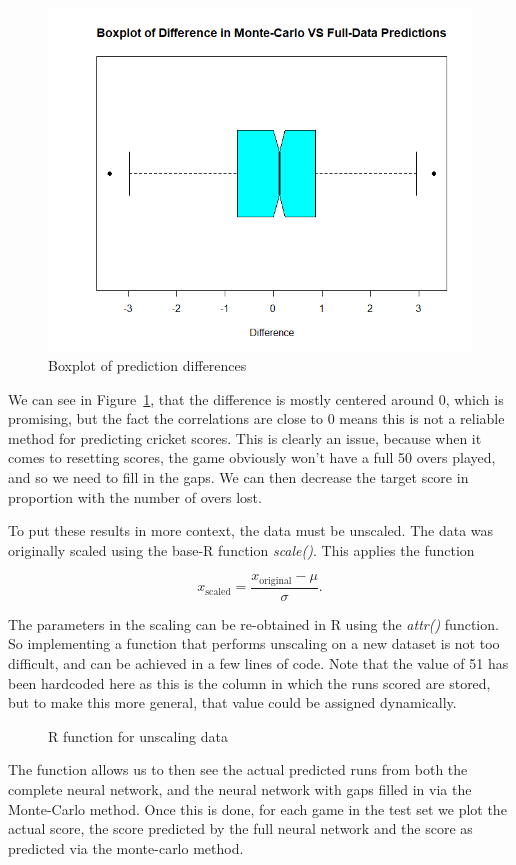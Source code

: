\begin{figure}[h]
    \centering
    \includegraphics[width=0.4\linewidth]{figures/diffbox.png}
    \caption{Boxplot of prediction differences}
    \label{diffbox}
\end{figure}

We can see in Figure~\ref{diffbox}, that the difference is mostly centered around 0, which is promising, but the fact the correlations are close to 0 means this is not a reliable method for predicting 
cricket scores. This is clearly an issue, because when it comes to resetting scores, the game obviously won't have a full 50 overs played, and so we need to fill in the gaps. We can then decrease the target score in proportion 
with the number of overs lost.

To put these results in more context, the data must be unscaled. The data was originally scaled using the base-R function \textit{scale()}. This applies the function

\[
    x_{\text{scaled}} = \frac{x_{\text{original}}-\mu}{\sigma}.    
\]

The parameters in the scaling can be re-obtained in R using the \textit{attr()} function. So implementing a function that 
performs unscaling on a new dataset is not too difficult, and can be achieved in a few lines of code. Note that the value of 51 has been hardcoded 
here as this is the column in which the runs scored are stored, but to make this more general, that value could be assigned dynamically.

\begin{figure}[h]
    
    \caption{R function for unscaling data}
    \label{unscale}
\end{figure}

The function allows us to then see the actual predicted runs from both the complete neural network, and the neural network with 
gaps filled in via the Monte-Carlo method. Once this is done, for each game in the test set we plot the actual score, the score predicted by the full neural network and 
the score as predicted via the monte-carlo method. \\ 

